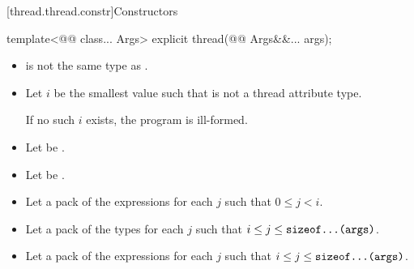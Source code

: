 \documentclass{wg21}
\begin{document}
[thread.thread.constr]{Constructors}

\begin{itemdecl}
template<@@ class... Args>
explicit thread(@@ Args&&... args);
\end{itemdecl}

\begin{itemdescr}

\pnum
\constraints
\begin{itemize}
\item {} is not the same type as .
\end{itemize}

\begin{addedblock}
\begin{itemize}[leftmargin=*]
\item Let $i$ be the smallest value such that  is not a thread attribute type. 

If no such $i$ exists, the program is ill-formed.

\item Let  be .
\item Let  be .
\item Let  a pack of the expressions  for each $j$ such that $ 0 \leq j < i $.
\item Let  a pack of the types  for each $j$ such that $ i \le j \le \texttt{sizeof...(args)}$.
\item Let  a pack of the expressions  for each $j$ such that $ i \le j \le \texttt{sizeof...(args)}$.
\end{itemize}
\end{addedblock}


\end{itemdescr}
\end{document}
